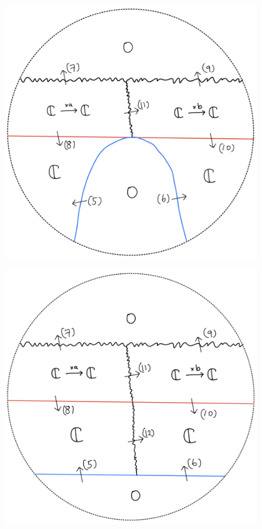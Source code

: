 \begin{figure}[H]
    \centering
    \includegraphics[scale = 0.45]{diagrams/lemma2/43.png} 
    \caption{}
    \label{fig:your-label}
\end{figure}
\begin{figure}[H]
    \centering
    \includegraphics[scale = 0.45]{diagrams/lemma2/44.png} 
    \caption{}
    \label{fig:your-label}
\end{figure}
